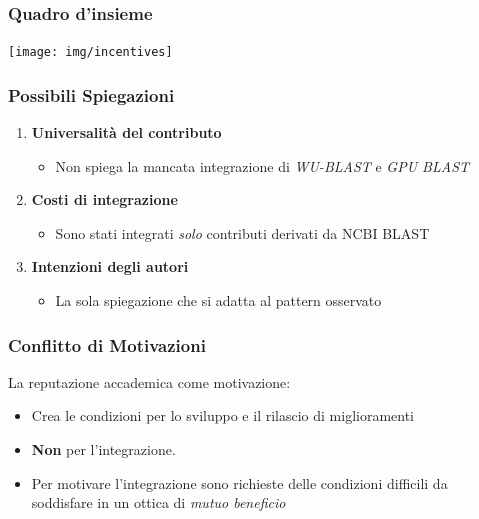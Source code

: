 \begin{frame}\frametitle{Quadro d'insieme}

\begin{center}
    \texttt{[image: img/incentives]}
\end{center}

\end{frame}

\begin{frame}\frametitle{Possibili Spiegazioni}

\Large

\begin{enumerate}[<+->]
\def\labelenumi{\arabic{enumi}.}
\itemsep1pt\parskip0pt
\item
  \textbf{Universalità del contributo}

  \begin{itemize}[<+->]
  \itemsep1pt\parskip0pt
  \item
    Non spiega la mancata integrazione di \emph{WU-BLAST} e \emph{GPU
    BLAST}
  \end{itemize}
\item
  \textbf{Costi di integrazione}

  \begin{itemize}[<+->]
  \itemsep1pt\parskip0pt
  \item
    Sono stati integrati \emph{solo} contributi derivati da NCBI BLAST
  \end{itemize}
\item
  \textbf{Intenzioni degli autori}

  \begin{itemize}[<+->]
  \itemsep1pt\parskip0pt
  \item
    La sola spiegazione che si adatta al pattern osservato
  \end{itemize}
\end{enumerate}

\end{frame}

\begin{frame}\frametitle{Conflitto di Motivazioni}

\Large{La reputazione accademica come \alert{motivazione}:}

\begin{itemize}[<+->]
\itemsep1pt\parskip0pt
\item
  Crea le condizioni per lo sviluppo e il rilascio di miglioramenti
\item
  \textbf{Non} per l'integrazione.
\item
  Per motivare l'integrazione sono richieste delle condizioni
  \alert{difficili} da soddisfare in un ottica di
  \alert{\em{mutuo beneficio}}
\end{itemize}

\end{frame}

